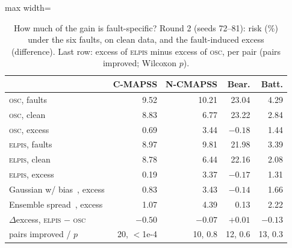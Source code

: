 \documentclass{esannV2}
\newcommand{\OSC}{\textsc{osc}}
\newcommand{\RPT}{\textsc{elpis}}
\begin{document}
\begin{table}[!htbp]
\caption{How much of the gain is fault-specific? Round 2 (seeds 72--81): risk (\%) under the six faults, on clean data, and the fault-induced excess (difference). Last row: excess of \RPT{} minus excess of \OSC, per pair (pairs improved; Wilcoxon $p$).}
\label{tab:excess}
\centering\footnotesize
\begin{adjustbox}{max width=\textwidth}\begin{tabular}{lrrrr}
\toprule
 & C-MAPSS & N-CMAPSS & Bear. & Batt.\\
\midrule
\OSC, faults & 9.52 & 10.21 & 23.04 & 4.29\\
\OSC, clean & 8.83 & 6.77 & 23.22 & 2.84\\
\OSC, excess & 0.69 & 3.44 & $-0.18$ & 1.44\\
\RPT, faults & 8.97 & 9.81 & 21.98 & 3.39\\
\RPT, clean & 8.78 & 6.44 & 22.16 & 2.08\\
\RPT, excess & 0.19 & 3.37 & $-0.17$ & 1.31\\
Gaussian w/ bias~\cite{nix1994estimating}, excess & 0.83 & 3.43 & $-0.14$ & 1.66\\
Ensemble spread~\cite{lakshminarayanan2017simple}, excess & 1.07 & 4.39 & 0.13 & 2.22\\
\midrule
$\Delta$excess, \RPT{} $-$ \OSC & $-0.50$ & $-0.07$ & $+0.01$ & $-0.13$\\
\quad pairs improved / $p$ & 20, $<$1e-4 & 10, 0.8 & 12, 0.6 & 13, 0.3\\
\bottomrule
\end{tabular}\end{adjustbox}
\end{table}
\end{document}
